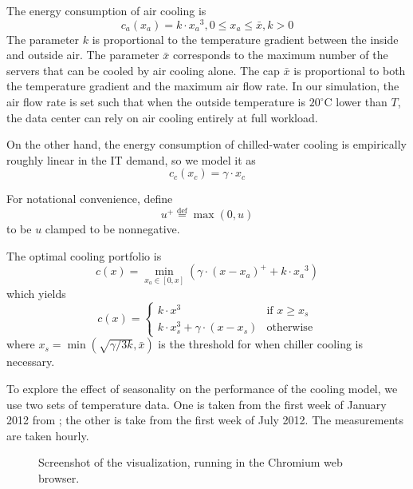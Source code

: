 \documentclass{acm_proc_article-sp}
\newcommand{\eqdef}{\ensuremath{\overset{\mathrm{def}}{=}}}
\begin{document}
The energy consumption of air cooling is
\begin{equation}
c_a(x_a) = k \cdot {x_a}^3, 0 \leq x_a \leq \bar{x}, k > 0
\end{equation}
The parameter $k$ is proportional to the temperature gradient between the inside and outside air. The parameter $\bar{x}$ corresponds to the maximum number of the servers that can be cooled by air cooling alone. The cap $\bar{x}$ is proportional to both the temperature gradient and the maximum air flow rate. In our simulation, the air flow rate is set such that when the outside temperature is $20^{\circ}\mathrm{C}$ lower than $T$, the data center can rely on air cooling entirely at full workload.

On the other hand, the energy consumption of chilled-water cooling is empirically roughly linear in the IT demand, so we model it as
\begin{equation}
c_c(x_c) = \gamma \cdot x_c
\end{equation}

For notational convenience, define
\begin{equation}
	u^+ \eqdef \max(0, u)
\end{equation}
to be $u$ clamped to be nonnegative.

The optimal cooling portfolio is
\begin{equation}
c(x) = \min_{x_a \in [0,x]}\left( \gamma \cdot (x-x_a)^+ + k \cdot {x_a}^3 \right)
\end{equation}
which yields
$$
c(x) = \left\{ \begin{array}{ll}
	k \cdot x^3 & \mbox{if $x \geq x_s$}\\
	k \cdot x_s^3 + \gamma \cdot (x-x_s) & \mbox{otherwise}\end{array} \right.
$$
where $x_s = \min \left(\sqrt{\gamma/3k}, \bar{x}\right)$ is the threshold for when chiller cooling is necessary.

To explore the effect of seasonality on the performance of the cooling model, we use two sets of temperature data. One is taken from the first week of January 2012 from \cite{temp}; the other is take from the first week of July 2012. The measurements are taken hourly.

\begin{figure*}
\centering
{}
\caption{Screenshot of the visualization, running in the Chromium web browser.}
\end{figure*}
\end{document}
